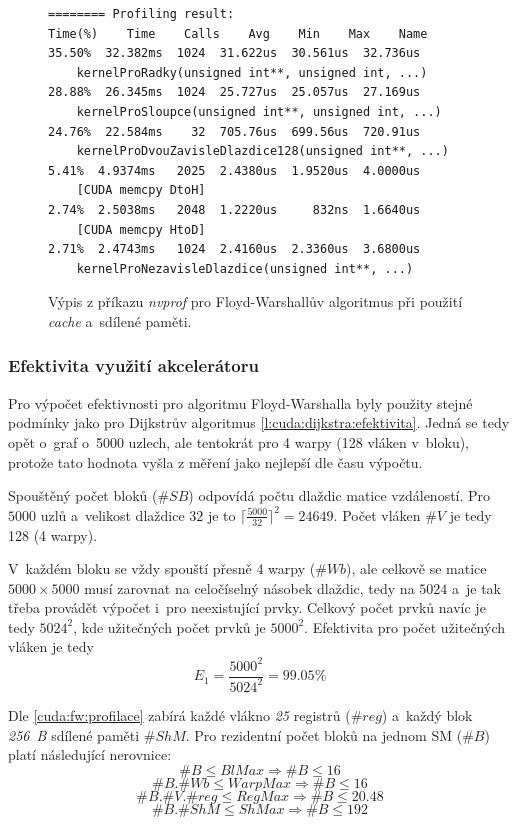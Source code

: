 \begin{figure}
	\centering
	\begin{verbatim}
======== Profiling result:
Time(%)    Time    Calls    Avg    Min    Max    Name
35.50%  32.382ms  1024  31.622us  30.561us  32.736us
    kernelProRadky(unsigned int**, unsigned int, ...)
28.88%  26.345ms  1024  25.727us  25.057us  27.169us
    kernelProSloupce(unsigned int**, unsigned int, ...)
24.76%  22.584ms    32  705.76us  699.56us  720.91us
    kernelProDvouZavisleDlazdice128(unsigned int**, ...)
5.41%  4.9374ms   2025  2.4380us  1.9520us  4.0000us
    [CUDA memcpy DtoH]
2.74%  2.5038ms   2048  1.2220us     832ns  1.6640us
    [CUDA memcpy HtoD]
2.71%  2.4743ms   1024  2.4160us  2.3360us  3.6800us
    kernelProNezavisleDlazdice(unsigned int**, ...)
	\end{verbatim}
	\caption{Výpis z příkazu \emph{nvprof} pro Floyd-Warshallův algoritmus při použití \emph{cache} a~sdílené paměti.}
    \label{f:cuda:floyd:profilace2}
\end{figure}

\subsubsection{Efektivita využití akcelerátoru} \label{l:cuda:floyd:efektivita}
Pro výpočet efektivnosti pro algoritmu Floyd-Warshalla byly použity stejné podmínky jako pro Dijkstrův algoritmus \ref{l:cuda:dijkstra:efektivita}. Jedná se tedy opět o~graf o~5000 uzlech, ale tentokrát pro 4 warpy (128 vláken v~bloku), protože tato hodnota vyšla z měření jako nejlepší dle času výpočtu.

Spouštěný počet bloků ($\#SB$) odpovídá počtu dlaždic matice vzdáleností. Pro $5000$ uzlů a~velikost dlaždice $32$ je to 
$\lceil \frac{5000}{32} \rceil ^ 2 = 24649$. Počet vláken $\#V$ je tedy 128 (4 warpy).

V~každém bloku se vždy spouští přesně 4 warpy ($ \#Wb $), ale celkově se matice $5000 \times 5000$ musí zarovnat na celočíselný násobek
dlaždic, tedy na $5024$ a~je tak třeba provádět výpočet i~pro neexistující prvky. Celkový počet prvků navíc je tedy $ 5024^2 $, kde 
užitečných počet prvků je $ 5000^2 $. Efektivita pro počet užitečných vláken je tedy
$$ E_1 = \frac{5000^2}{5024^2} = 99.05 \% $$


Dle \ref{cuda:fw:profilace} zabírá každé vlákno \emph{25} registrů ($\#reg$) a~každý blok \emph{256~B} sdílené paměti $\#ShM$. Pro rezidentní počet 
bloků na jednom SM ($\#B$)  platí následující nerovnice:
$$               \#B \leq BlMax   \Rightarrow  \#B \leq 16    $$
$$        \#B . \#Wb \leq WarpMax \Rightarrow  \#B \leq 16    $$
$$ \#B . \#V . \#reg \leq RegMax  \Rightarrow  \#B \leq 20.48 $$
$$       \#B . \#ShM \leq ShMax   \Rightarrow  \#B \leq 192   $$

